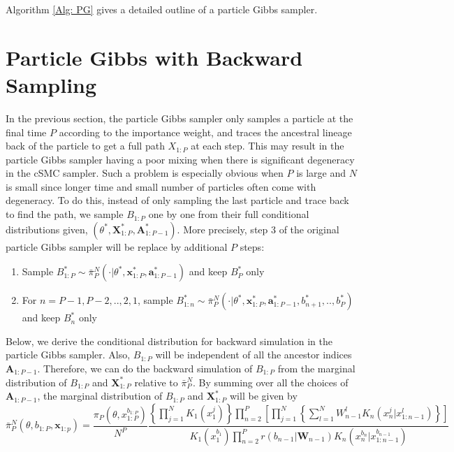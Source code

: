 \documentclass[12pt,a4paper]{article}
\begin{document}
Algorithm \ref{Alg: PG} gives a detailed outline of a particle Gibbs sampler. 
\section{Particle Gibbs with Backward Sampling}
In the previous section, the particle Gibbs sampler only samples a particle at the final time $P$ according to the importance weight, and traces the ancestral lineage back of the particle to get a full path $X_{1:P}$ at each step. This may result in the particle Gibbs sampler having a poor mixing when there is significant degeneracy in the cSMC sampler. Such a problem is especially obvious when $P$ is large and $N$ is small since longer time and small number of particles often come with degeneracy. To do this, instead of only sampling the last particle and trace back to find the path, we sample $B_{1:P}$ one by one from their full conditional distributions given, $\left(\theta^{*},\textbf{X}_{1:P}^{*},\textbf{A}_{1:P-1}^{*}\right)$. More precisely, step 3 of the original particle Gibbs sampler will be replace by additional $P$ steps:
\begin{enumerate}
    \item Sample $B_{1:P}^{*} \sim \bar{\pi}_P^N \left(\cdot | \theta^{*}, \textbf{x}_{1:P}^{*},\textbf{a}_{1:P-1}^{*}\right)$ and keep $B_P^{*}$ only
    \item For $n=P-1,P-2,..,2,1$, sample $B_{1:n}^{*} \sim \bar{\pi}_P^N\left(\cdot|\theta^{*},\textbf{x}_{1:P}^{*},\textbf{a}_{1:P-1}^{*},b_{n+1}^{*},..,b_P^{*}\right)$ and keep $B_n^{*}$ only 
\end{enumerate}
Below, we derive the conditional distribution for backward simulation in the particle Gibbs sampler. Also, $B_{1:P}$ will be independent of all the ancestor indices $\textbf{A}_{1:P-1}$. Therefore, we can do the backward simulation of $B_{1:P}$ from the marginal distribution of $B_{1:P}$ and $\textbf{X}_{1:P}^{*}$ relative to $\bar{\pi}_P^N$. By summing over all the choices of $\textbf{A}_{1:P-1}$, the marginal distribution of $B_{1:P}$ and $\textbf{X}_{1:P}^{*}$ will be given by 
\begin{equation}
    \label{Eqn:Marginal of Pi_Bar}
    \bar{\pi}_P^N \left(\theta,b_{1:P},\textbf{x}_{1:p}\right) = \frac{\pi_P\left(\theta,x_{1:P}^{b_{1:P}}\right)}{N^P} \frac{\left\{\prod_{j=1}^N K_1(x_1^j)\right\}\prod_{n=2}^P \left[\prod_{j=1}^N \left\{\sum_{l=1}^N W_{n-1}^l K_n (x_n^j|x_{1:n-1}^l)\right\}\right]}{K_1\left(x_1^{b_1}\right)\prod_{n=2}^P r(b_{n-1}|\textbf{W}_{n-1}) K_n(x_n^{b_n}|x_{1:n-1}^{b_{n-1}})}
\end{equation}
\end{document}
